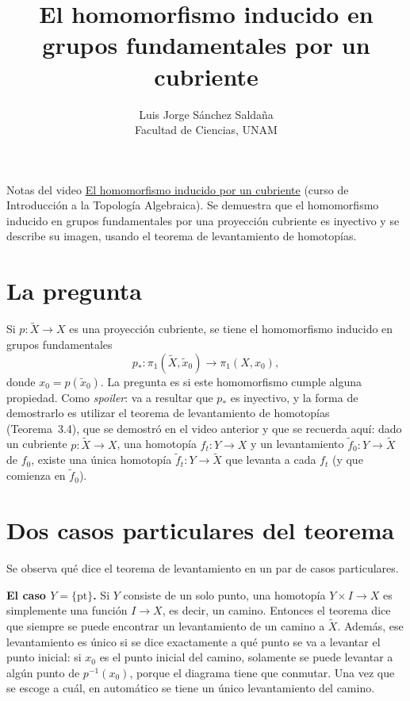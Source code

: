 \documentclass[11pt]{article}
\title{El homomorfismo inducido en grupos fundamentales por un cubriente}
\author{Luis Jorge Sánchez Saldaña\\[2pt]\small Facultad de Ciencias, UNAM}
\date{}
\begin{document}
\maketitle

\noindent\small Notas del video
\href{https://www.youtube.com/watch?v=jjm_k9aTTyE}{\guillemotleft{}El homomorfismo inducido por un cubriente\guillemotright{}}
(curso de Introducción a la Topología Algebraica). Se demuestra que el homomorfismo inducido en grupos fundamentales por una proyección cubriente es inyectivo y se describe su imagen, usando el teorema de levantamiento de homotopías.
\normalsize

\section*{La pregunta}

Si $p\colon\tilde X\to X$ es una proyección cubriente, se tiene el homomorfismo inducido en grupos fundamentales
\[
  p_*\colon\pi_1(\tilde X,\tilde x_0)\to\pi_1(X,x_0),
\]
donde $x_0=p(\tilde x_0)$. La pregunta es si este homomorfismo cumple alguna propiedad. Como \emph{spoiler}: va a resultar que $p_*$ es inyectivo, y la forma de demostrarlo es utilizar el teorema de levantamiento de homotopías (Teorema~3.4), que se demostró en el video anterior y que se recuerda aquí: dado un cubriente $p\colon\tilde X\to X$, una homotopía $f_t\colon Y\to X$ y un levantamiento $\tilde f_0\colon Y\to\tilde X$ de $f_0$, existe una única homotopía $\tilde f_t\colon Y\to\tilde X$ que levanta a cada $f_t$ (y que comienza en $\tilde f_0$).

\section*{Dos casos particulares del teorema}

Se observa qué dice el teorema de levantamiento en un par de casos particulares.

\medskip\noindent\textbf{El caso $Y=\{\mathrm{pt}\}$.} Si $Y$ consiste de un solo punto, una homotopía $Y\times I\to X$ es simplemente una función $I\to X$, es decir, un camino. Entonces el teorema dice que siempre se puede encontrar un levantamiento de un camino a $\tilde X$. Además, ese levantamiento es único si se dice exactamente a qué punto se va a levantar el punto inicial: si $x_0$ es el punto inicial del camino, solamente se puede levantar a algún punto de $p^{-1}(x_0)$, porque el diagrama tiene que conmutar. Una vez que se escoge a cuál, en automático se tiene un único levantamiento del camino.
\end{document}
